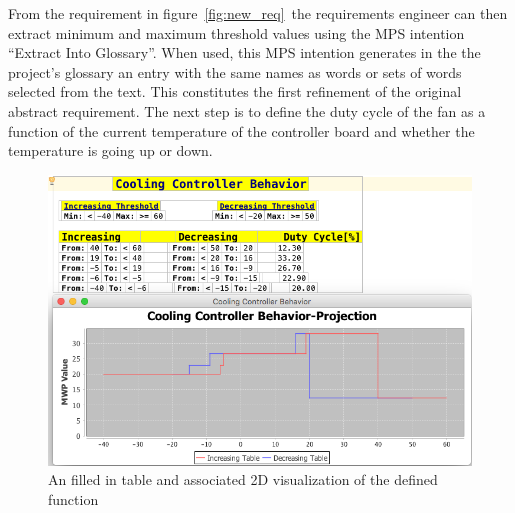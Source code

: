 From the requirement in figure~\ref{fig:new_req} the requirements engineer can
then extract minimum and maximum threshold values using the MPS intention
``Extract Into Glossary''. When used, this MPS intention generates in the the
project's glossary an entry with the same names as words or sets of words
selected from the text. This constitutes the first refinement of the original
abstract requirement. The next step is to define the duty cycle of the fan as a
function of the current temperature of the controller board and whether the
temperature is going up or down.
 \vspace{-.5cm}

% 
\begin{figure}[!h]
\centering
\includegraphics[width=.7\textwidth]{./figures/DiehlTableAnd2DGraph.png}
\caption{An filled in table and associated 2D visualization of the defined
function} 
\label{fig:FAU_behavior_2d}
 \vspace{-.7cm}
\end{figure}
